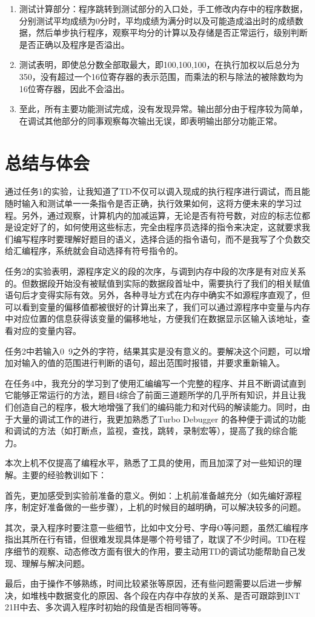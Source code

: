 \documentclass{article}
\begin{document}
\begin{enumerate}
			\item 测试计算部分：程序跳转到测试部分的入口处，手工修改内存中的程序数据，分别测试平均成绩为0分时，平均成绩为满分时以及可能造成溢出时的成绩数据，然后单步执行程序，观察平均分的计算以及存储是否正常运行，级别判断是否正确以及程序是否溢出。
			\item 测试表明，即使总分数全部取最大，即100,100,100，在执行加权以后总分为350，没有超过一个16位寄存器的表示范围，而乘法的积与除法的被除数均为16位寄存器，因此不会溢出。
			\item 至此，所有主要功能测试完成，没有发现异常。输出部分由于程序较为简单，在调试其他部分的同事观察每次输出无误，即表明输出部分功能正常。
		\end{enumerate}

		\newpage
		\section{总结与体会}

		通过任务1的实验，让我知道了TD不仅可以调入现成的执行程序进行调试，而且能随时输入和测试单一一条指令是否正确，执行效果如何，这将方便未来的学习过程。另外，通过观察，计算机内的加减运算，无论是否有符号数，对应的标志位都是设定好了的，如何使用这些标志，完全由程序员选择的指令来决定，这就要求我们编写程序时要理解好题目的语义，选择合适的指令语句，而不是我写了个负数交给汇编程序，系统就会自动选择有符号指令的。 \par
		任务2的实验表明，源程序定义的段的次序，与调到内存中段的次序是有对应关系的。但数据段开始没有被赋值到实际的数据段首址中，需要执行了我们的相关赋值语句后才变得实际有效。另外，各种寻址方式在内存中确实不如源程序直观了，但可以看到变量的偏移值都被很好的计算出来了，我们可以通过源程序中变量与内存中对应位置的信息获得该变量的偏移地址，方便我们在数据显示区输入该地址，查看对应的变量内容。\par
		任务2中若输入0~9之外的字符，结果其实是没有意义的。要解决这个问题，可以增加对输入的值的范围进行判断的语句，超出范围时报错，并要求重新输入。\par
		在任务4中，我充分的学习到了使用汇编编写一个完整的程序、并且不断调试直到它能够正常运行的方法，题目4综合了前面三道题所学的几乎所有知识，并且让我们创造自己的程序，极大地增强了我们的编码能力和对代码的解读能力。同时，由于大量的调试工作的进行，我更加熟悉了Turbo Debugger 的各种便于调试的功能和调试的方法（如打断点，监视，查找，跳转，录制宏等），提高了我的综合能力。\par
		本次上机不仅提高了编程水平，熟悉了工具的使用，而且加深了对一些知识的理解。主要的经验教训如下： \par
		首先，更加感受到实验前准备的意义。例如：上机前准备越充分（如先编好源程序，制定好准备做的一些步骤），上机的时候目的越明确，可以解决较多的问题。\par
		其次，录入程序时要注意一些细节，比如中文分号、字母O等问题，虽然汇编程序指出其所在行有错，但很难发现具体是哪个符号错了，耽误了不少时间。TD在程序细节的观察、动态修改方面有很大的作用，要主动用TD的调试功能帮助自己发现、理解与解决问题。\par
		最后，由于操作不够熟练，时间比较紧张等原因，还有些问题需要以后进一步解决，如堆栈中数据变化的原因、各个段在内存中存放的关系、是否可跟踪到INT 21H中去、多次调入程序时初始的段值是否相同等等。\par
\end{document}
